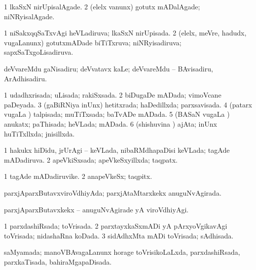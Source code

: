 {\bentry
{} 
\gl{\kirxvi}
\expl{}
\bmng
\bnum
\num{1} lkaSxN nirUpisalAgade. 
\num{2} (elelx \mo vanunx) gotutx mADalAgade; niNRyisalAgade. 
\enum
\emng
\eentry

\bentry
{} 
\gl{\gu}
\expl{}
\bmng
\bnum
\num{1} niSakxqqSaTxvAgi heVLadiruva; lkaSxN nirUpisada. 
\num{2} (elelx, meVre, hadudx, \mo vugaLanunx) gotutxmADade biTiTxruva; niNRyisadiruva; sapxSaTxgoLisadiruva. 
\enum
\emng
\eentry

\bentry
{} 
\gl{\sakirx}
\expl{}
\bmng
 deVvareMdu gaNisadiru; deVvatavx kaLe; deVvareMdu -- BAvisadiru, ArAdhisadiru. 
\emng
\eentry

\bentry
{} 
\gl{\gu}
\expl{}
\bmng
\bnum
\num{1} udadhxrisada; uLisada; rakiSxsada. 
\num{2} biDugaDe mADada; vimoVcane paDeyada. 
\num{3} (gaBiRNiya \vi inUnx) hetitxrada; haDedillxda; parxsavisada. 
\num{4} (patarx \mo vugaLa \vi) talpisada; muTiTxsada; baTvADe mADada. 
\num{5} (BASaN \mo vugaLa \vi) anukatx; paThisada; heVLada; mADada. 
\num{6} (shishuvina \vi) ajAta; inUnx huTiTxllxda; jnisillxda. 
\enum
\emng
\eentry

\bentry
{} 
\gl{\gu}
\expl{}
\bmng
\bnum
\num{1} hakukx hiDidu, jrUrAgi -- keVLada, nibaRMdhapaDisi keVLada; tagAde mADadiruva. 
\num{2} apeVkiSxsada; apeVkeSxyillxda; taqpatx. 
\enum
\emng
\eentry

\bentry
{} 
\gl{\nA}
\expl{}
\bmng
\bnum
\num{1} tagAde mADadiruvike. 
\num{2} anapeVkeSx; taqpitx. 
\enum
\emng
\eentry

\bentry
{} 
\gl{\gu}
\expl{}
\bmng
 parxjAparxButavxviroVdhiyAda; parxjAtaMtarxkekx anuguNvAgirada. 
\emng
\eentry

\bentry
{} 
\gl{\kirxvi}
\expl{}
\bmng
 parxjAparxButavxkekx -- anuguNvAgirade yA viroVdhiyAgi. 
\emng
\eentry

\bentry
{} 
\gl{\gu}
\expl{}
\bmng
\bnum
\num{1} parxdashiRsada; toVrisada. 
\num{2} parxtayxkaSxmADi yA pArxyoVgikavAgi toVrisada; nidashaRna koDada. 
\num{3} sidAdhxMta mADi toVrisada; sAdhisada. 
\enum
\emng
\eentry

\bentry
{} 
\gl{\gu}
\expl{}
\bmng
 saMyamada; manoVBAvagaLanunx horage toVrisikoLaLxda, parxdashiRsada, parxkaTisada, bahiraMgapaDisada. 
\emng
\eentry

}
